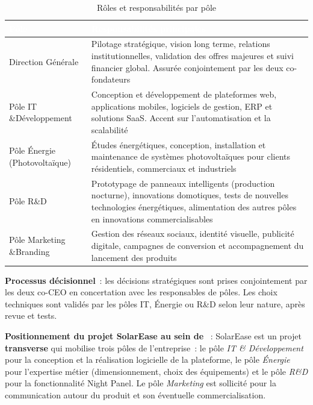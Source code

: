 \begin{table}[H]
  \caption{Rôles et responsabilités par pôle}
  \label{tab:roles-organisation}
  \centering\small
  \begin{tabularx}{\textwidth}{|L{3.8cm}|X|}
    \hline
    \textcolor{white}{\textbf{Pôle}} &
    \textcolor{white}{\textbf{Responsabilités principales}} \\
    \hline
    Direction Générale &
    Pilotage stratégique, vision long terme, relations institutionnelles,
    validation des offres majeures et suivi financier global. Assurée
    conjointement par les deux co-fondateurs \\
    \hline
    Pôle IT \&\@ Développement &
    Conception et développement de plateformes web, applications mobiles,
    logiciels de gestion, ERP et solutions SaaS. Accent sur
    l'automatisation et la scalabilité \\
    \hline
    Pôle Énergie (Photovoltaïque) &
    Études énergétiques, conception, installation et maintenance de
    systèmes photovoltaïques pour clients résidentiels, commerciaux
    et industriels \\
    \hline
    Pôle R\&D &
    Prototypage de panneaux intelligents (production nocturne),
    innovations domotiques, tests de nouvelles technologies
    énergétiques, alimentation des autres pôles en innovations
    commercialisables \\
    \hline
    Pôle Marketing \&\@ Branding &
    Gestion des réseaux sociaux, identité visuelle, publicité
    digitale, campagnes de conversion et accompagnement du lancement
    des produits \\
    \hline
  \end{tabularx}
\end{table}

\noindent\textbf{Processus décisionnel}~: les décisions stratégiques sont
prises conjointement par les deux co-CEO en concertation avec les
responsables de pôles. Les choix techniques sont validés par les pôles
IT, Énergie ou R\&D selon leur nature, après revue et tests.

\noindent\textbf{Positionnement du projet SolarEase au sein de
\organisme}~: SolarEase est un projet \textbf{transverse} qui mobilise
trois pôles de l'entreprise~: le pôle \emph{IT \& Développement} pour
la conception et la réalisation logicielle de la plateforme, le pôle
\emph{Énergie} pour l'expertise métier (dimensionnement, choix des
équipements) et le pôle \emph{R\&D} pour la fonctionnalité Night Panel.
Le pôle \emph{Marketing} est sollicité pour la communication autour du
produit et son éventuelle commercialisation.

